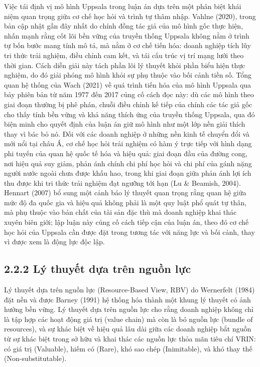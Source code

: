\documentclass[
  a4paper,
  13pt]{extreport}
\begin{document}
Việc tái định vị mô hình Uppsala trong luận án dựa trên một phân biệt
khái niệm quan trọng giữa cơ chế học hỏi và trình tự thâm nhập. Vahlne
(2020), trong bản cập nhật gần đây nhất do chính đồng tác giả của mô
hình gốc thực hiện, nhấn mạnh rằng cốt lõi bền vững của truyền thống
Uppsala không nằm ở trình tự bốn bước mang tính mô tả, mà nằm ở cơ chế
tiến hóa: doanh nghiệp tích lũy tri thức trải nghiệm, điều chỉnh cam
kết, và tái cấu trúc vị trí mạng lưới theo thời gian. Cách diễn giải này
tách phần lõi lý thuyết khỏi phần biểu hiện thực nghiệm, do đó giải
phóng mô hình khỏi sự phụ thuộc vào bối cảnh tiền số. Tổng quan hệ thống
của Wach (2021) về quá trình tiến hóa của mô hình Uppsala qua bảy phiên
bản từ năm 1977 đến 2017 củng cố cách đọc này: dù các mô hình theo giai
đoạn thường bị phê phán, chuỗi điều chỉnh kế tiếp của chính các tác giả
gốc cho thấy tính bền vững và khả năng thích ứng của truyền thống
Uppsala, qua đó biện minh cho quyết định của luận án giữ mô hình như một
lớp nền giải thích thay vì bác bỏ nó. Đối với các doanh nghiệp ở những
nền kinh tế chuyển đổi và mới nổi tại châu Á, cơ chế học hỏi trải nghiệm
có hàm ý trực tiếp với hình dạng phi tuyến của quan hệ quốc tế hóa và
hiệu quả: giai đoạn đầu của đường cong, nơi hiệu quả suy giảm, phản ánh
chính chi phí học hỏi và chi phí của gánh nặng người nước ngoài chưa
được khấu hao, trong khi giai đoạn giữa phản ánh lợi ích thu được khi
tri thức trải nghiệm đạt ngưỡng tới hạn (Lu \& Beamish, 2004). Hennart
(2007) bổ sung một cảnh báo lý thuyết quan trọng rằng quan hệ giữa mức
độ đa quốc gia và hiệu quả không phải là một quy luật phổ quát tự thân,
mà phụ thuộc vào bản chất của tài sản đặc thù mà doanh nghiệp khai thác
xuyên biên giới; lập luận này củng cố cách tiếp cận của luận án, theo đó
cơ chế học hỏi của Uppsala cần được đặt trong tương tác với năng lực và
bối cảnh, thay vì được xem là động lực độc lập.

\hypertarget{luxfd-thuyux1ebft-dux1ef1a-truxean-nguux1ed3n-lux1ef1c}{%
\subsection{2.2.2 Lý thuyết dựa trên nguồn
lực}\label{luxfd-thuyux1ebft-dux1ef1a-truxean-nguux1ed3n-lux1ef1c}}

Lý thuyết dựa trên nguồn lực (Resource-Based View, RBV) do Wernerfelt
(1984) đặt nền và được Barney (1991) hệ thống hóa thành một khung lý
thuyết có ảnh hưởng bền vững. Lý thuyết dựa trên nguồn lực cho rằng
doanh nghiệp không chỉ là tập hợp các hoạt động giá trị (value chain) mà
còn là bó nguồn lực (bundle of resources), và sự khác biệt về hiệu quả
lâu dài giữa các doanh nghiệp bắt nguồn từ sự khác biệt trong sở hữu và
khai thác các nguồn lực thỏa mãn tiêu chí VRIN: có giá trị (Valuable),
hiếm có (Rare), khó sao chép (Inimitable), và khó thay thế
(Non-substitutable).
\end{document}
